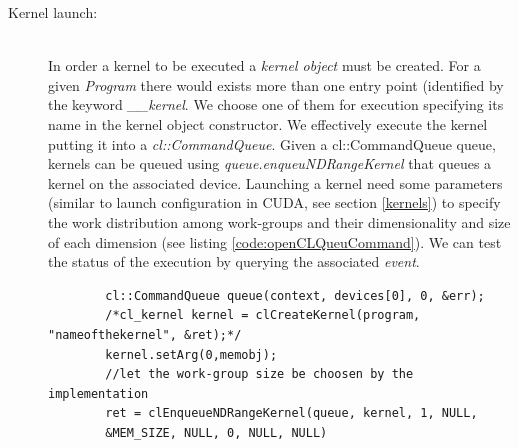 \begin{description}
\begin{description}
    	
    	\item [Kernel launch:]\hfil \\
    	In order a kernel to be executed a \emph{kernel object} must be created.
    	For a given \emph{Program} there would exists more than one entry point
    	(identified by the keyword \emph{\_\_kernel}. We choose one of them for
    	execution specifying its name in the kernel object constructor.    	
    	 We effectively execute the kernel putting it into a 
    	\emph{cl::CommandQueue}. Given a cl::CommandQueue queue, kernels can be queued
    	using \textit{queue.enqueu\-NDRangeKernel} that queues a kernel on
    	the associated device.
    	Launching a kernel need some parameters (similar to launch configuration in
    	CUDA, see section \ref{kernels}) to specify the work distribution among
    	work-groups and their dimensionality and size of each dimension (see listing
    	\ref{code:openCLQueuCommand}). We can test the status of the execution by
    	querying the associated \emph{event}.
    	\begin{lstlisting}
    	cl::CommandQueue queue(context, devices[0], 0, &err);
	    /*cl_kernel kernel = clCreateKernel(program, "nameofthekernel", &ret);*/
	    kernel.setArg(0,memobj);
	    //let the work-group size be choosen by the implementation 
	    ret = clEnqueueNDRangeKernel(queue, kernel, 1, NULL,
	    &MEM_SIZE, NULL, 0, NULL, NULL)
    	\end{lstlisting}
    \end{description}
\end{description}
 
